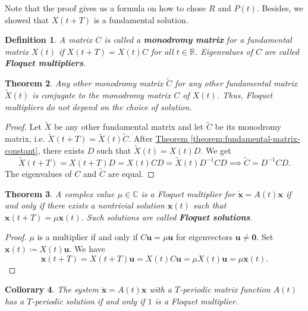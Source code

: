 \documentclass[hidelinks,a4paper, 11pt]{article}
\theoremstyle{plain}
\newtheorem{theorem}{Theorem}
\newtheorem{collorary}[theorem]{Collorary}
\theoremstyle{break}
\theoremstyle{plain}
\newtheorem{definition}[theorem]{Definition}
\theoremstyle{definition}
\begin{document}
{Note that the proof gives us a formula on how to chose $R$ and $P(t)$. Besides, we showed that $X(t+T)$ is a fundamental solution. 

\begin{definition}
	A matrix $C$ is called a \textbf{monodromy matrix} for a fundamental matrix $X(t)$ if $X(t+T) = X(t)C$ for all $t \in \mathbb R$. Eigenvalues of $C$ are called \textbf{Floquet multipliers}.
\end{definition}

\begin{theorem}
	Any other monodromy matrix $\tilde C$ for any other fundamental matrix $\tilde X(t)$ is conjugate to the monodromy matrix $C$ of $X(t)$. Thus, Floquet multipliers do not depend on the choice of solution.
\end{theorem}

\begin{proof}
	Let $\tilde X$ be any other fundamental matrix and let $\tilde C$ be its monodromy matrix, i.e. $\tilde X(t+T) = \tilde X(t) \tilde C$. After \hyperref[theorem:fundamental-matrix-constant]{Theorem \ref{theorem:fundamental-matrix-constant}}, there exists $D$ such that $\tilde X(t) = X(t)D$. We get
	\[
		\tilde X(t+T) = X(t+T)D=X(t)CD = \tilde X(t)D^{-1}CD \implies \tilde C = D^{-1}CD.
	\]
	The eigenvalues of $C$ and $\tilde C$ are equal.
\end{proof}

\begin{theorem}
	A complex value $\mu \in \mathbb C$ is a Floquet multiplier for $\mathbf{\dot x} = A(t) \mathbf x$ if and only if there exists a nontrivial solution $\mathbf x(t)$ such that $\mathbf x(t+T) = \mu \mathbf x(t)$. Such solutions are called \textbf{Floquet solutions}.
\end{theorem}

\begin{proof}
	$\mu$ is a multiplier if and only if $C\mathbf u = \mu \mathbf u$ for eigenvectors $\mathbf u \neq \mathbf 0$. Set $\mathbf x(t) \coloneqq X(t) \mathbf u$. We have
	\[
		\mathbf x(t+T) = X(t+T)\mathbf u = X(t)C\mathbf u = \mu X(t) \mathbf u = \mu \mathbf x(t).
	\]
\end{proof}

\begin{collorary}\label{chapter:floquet-t-periodic-collorary}
	The system $\mathbf{\dot x} = A(t) \mathbf x$ with a $T$-periodic matrix function $A(t)$ has a $T$-periodic solution if and only if $1$ is a Floquet multiplier.
\end{collorary}

}
\end{document}
